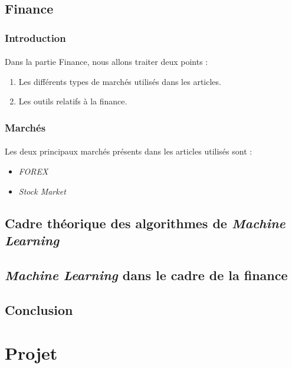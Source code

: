 \documentclass[a4paper, 11pt]{article}
\begin{document}
\subsection{Finance}
\subsubsection{Introduction}
\paragraph{}
Dans la partie Finance, nous allons traiter deux points :
\begin{enumerate}
\item Les différents types de marchés utilisés dans les articles.
\item Les outils relatifs à la finance.
\end{enumerate}

\subsubsection{Marchés}
\paragraph{}Les deux principaux marchés présents dans les articles utilisés sont :
\begin{itemize}
\item \textit{FOREX}
\item \textit{Stock Market}
\end{itemize}

\subsection{Cadre théorique des algorithmes de \textit{Machine Learning}}
\subsection{\textit{Machine Learning} dans le cadre de la finance}
\subsection{Conclusion}
\newpage
\section{Projet}
\newpage
\end{document}

